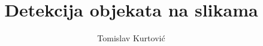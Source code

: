 \documentclass[times, utf8, zavrsni]{fer}
\begin{document}

\title{Detekcija objekata na slikama}

\author{Tomislav Kurtović}

\maketitle

\izvornik

\zahvala{}

\tableofcontents












\end{document}
